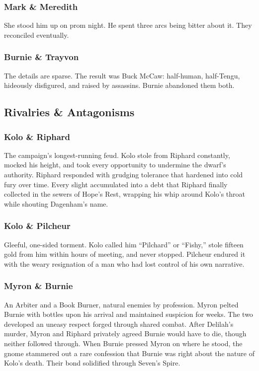 \subsubsection*{Mark \& Meredith}

She stood him up on prom night.  He spent three arcs being bitter about it.  They reconciled eventually.

\subsubsection*{Burnie \& Trayvon}

The details are sparse.  The result was Buck McCaw: half-human, half-Tengu, hideously disfigured, and raised by assassins.  Burnie abandoned them both.

\subsection*{Rivalries \& Antagonisms}

\subsubsection*{Kolo \& Riphard}

The campaign's longest-running feud.  Kolo stole from Riphard constantly, mocked his height, and took every opportunity to undermine the dwarf's authority.  Riphard responded with grudging tolerance that hardened into cold fury over time.  Every slight accumulated into a debt that Riphard finally collected in the sewers of Hope's Rest, wrapping his whip around Kolo's throat while shouting Dagenham's name.

\subsubsection*{Kolo \& Pilcheur}

Gleeful, one-sided torment.  Kolo called him ``Pilchard'' or ``Fishy,'' stole fifteen gold from him within hours of meeting, and never stopped.  Pilcheur endured it with the weary resignation of a man who had lost control of his own narrative.

\subsubsection*{Myron \& Burnie}

An Arbiter and a Book Burner, natural enemies by profession.  Myron pelted Burnie with bottles upon his arrival and maintained suspicion for weeks.  The two developed an uneasy respect forged through shared combat.  After Delilah's murder, Myron and Riphard privately agreed Burnie would have to die, though neither followed through.  When Burnie pressed Myron on where he stood, the gnome stammered out a rare confession that Burnie was right about the nature of Kolo's death.  Their bond solidified through Seven's Spire.

